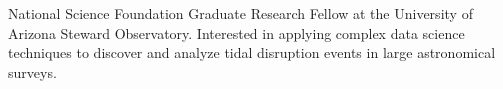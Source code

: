 \documentclass[a4paper, 12pt]{article}
\begin{document}
National Science Foundation Graduate Research Fellow at the University of Arizona Steward Observatory. Interested in applying complex data science techniques to discover and analyze tidal disruption events in large astronomical surveys.
\end{document}
